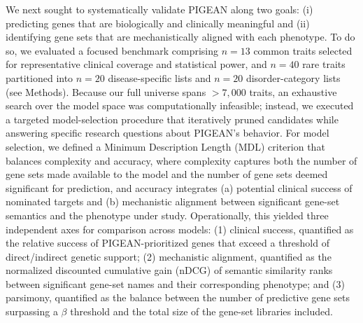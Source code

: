 We next sought to systematically validate PIGEAN along two goals: (i) predicting genes that are biologically and clinically meaningful and (ii) identifying gene sets that are mechanistically aligned with each phenotype. To do so, we evaluated a focused benchmark comprising $n=13$ common traits selected for representative clinical coverage and statistical power, and $n=40$ rare traits partitioned into $n=20$ disease-specific lists and $n=20$ disorder-category lists (see Methods). Because our full universe spans $>7,000$ traits, an exhaustive search over the model space was computationally infeasible; instead, we executed a targeted model-selection procedure that iteratively pruned candidates while answering specific research questions about PIGEAN’s behavior. For model selection, we defined a Minimum Description Length (MDL) criterion \cite{} that balances complexity and accuracy, where complexity captures both the number of gene sets made available to the model and the number of gene sets deemed significant for prediction, and accuracy integrates (a) potential clinical success of nominated targets and (b) mechanistic alignment between significant gene-set semantics and the phenotype under study. Operationally, this yielded three independent axes for comparison across models: (1) clinical success, quantified as the relative success \cite{minikel_refining_2024} of PIGEAN-prioritized genes that exceed a threshold of direct/indirect genetic support; (2) mechanistic alignment, quantified as the normalized discounted cumulative gain (nDCG) of semantic similarity ranks between significant gene-set names and their corresponding phenotype; and (3) parsimony, quantified as the balance between the number of predictive gene sets surpassing a $\beta$ threshold and the total size of the gene-set libraries included.

